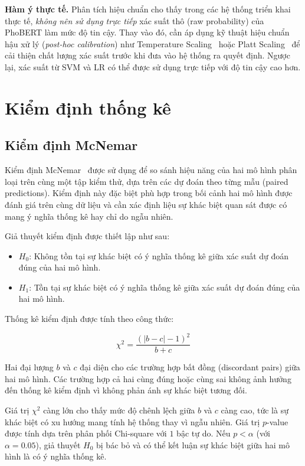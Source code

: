 \documentclass[12pt, a4paper]{report}
\begin{document}
\textbf{Hàm ý thực tế.} Phân tích hiệu chuẩn cho thấy trong các hệ thống triển khai thực tế, \textit{không nên sử dụng trực tiếp} xác suất thô (raw probability) của PhoBERT làm mức độ tin cậy. Thay vào đó, cần áp dụng kỹ thuật hiệu chuẩn hậu xử lý (\textit{post-hoc calibration}) như Temperature Scaling~\cite{guo2017calibration} hoặc Platt Scaling~\cite{platt1999calibration} để cải thiện chất lượng xác suất trước khi đưa vào hệ thống ra quyết định. Ngược lại, xác suất từ SVM và LR có thể được sử dụng trực tiếp với độ tin cậy cao hơn.

\section{Kiểm định thống kê}
\label{sec:statistics}

\subsection{Kiểm định McNemar}

Kiểm định McNemar~\cite{mcnemar1947} được sử dụng để so sánh hiệu năng của hai mô hình phân loại trên cùng một tập kiểm thử, dựa trên các dự đoán theo từng mẫu (paired predictions). Kiểm định này đặc biệt phù hợp trong bối cảnh hai mô hình được đánh giá trên cùng dữ liệu và cần xác định liệu sự khác biệt quan sát được có mang ý nghĩa thống kê hay chỉ do ngẫu nhiên.

Giả thuyết kiểm định được thiết lập như sau:

\begin{itemize}
    \item $H_0$: Không tồn tại sự khác biệt có ý nghĩa thống kê giữa xác suất dự đoán đúng của hai mô hình.
    \item $H_1$: Tồn tại sự khác biệt có ý nghĩa thống kê giữa xác suất dự đoán đúng của hai mô hình.
\end{itemize}

Thống kê kiểm định được tính theo công thức:

$$\chi^2 = \frac{(|b - c| - 1)^2}{b + c}$$

Hai đại lượng $b$ và $c$ đại diện cho các trường hợp bất đồng (discordant pairs) giữa hai mô hình. 
Các trường hợp cả hai cùng đúng hoặc cùng sai không ảnh hưởng đến thống kê kiểm định 
vì không phản ánh sự khác biệt tương đối.

Giá trị $\chi^2$ càng lớn cho thấy mức độ chênh lệch giữa $b$ và $c$ càng cao, 
tức là sự khác biệt có xu hướng mang tính hệ thống thay vì ngẫu nhiên. 
Giá trị $p$-value được tính dựa trên phân phối Chi-square với $1$ bậc tự do. 
Nếu $p < \alpha$ (với $\alpha = 0.05$), giả thuyết $H_0$ bị bác bỏ và có thể kết luận 
sự khác biệt giữa hai mô hình là có ý nghĩa thống kê.
\end{document}
